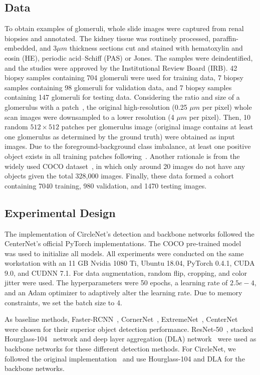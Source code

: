 \documentclass[journal]{IEEEtran}
\begin{document}
\subsection{Data}
To obtain examples of glomeruli, whole slide images were captured from renal biopsies and annotated. The kidney tissue was routinely processed, paraffin-embedded, and $3\mu m$ thickness sections cut and stained with hematoxylin and eosin (HE), periodic acid–Schiff (PAS) or Jones. The samples were deindentified, and the studies were approved by the Institutional Review Board (IRB). 42 biopsy samples containing 704 glomeruli were used for training data, 7 biopsy samples containing 98 glomeruli for validation data, and 7 biopsy samples containing 147 glomeruli for testing data. Considering the ratio and size of a glomerulus with a patch~\cite{puelles2011glomerular}, the original high-resolution (0.25 $\mu m$ per pixel) whole scan images were downsampled to a lower resolution (4 $\mu m$ per pixel). Then, 10 random $512 \times 512$ patches per glomerulus image (original image contains at least one glomerulus as determined by the ground truth) were obtained as input images. Due to the foreground-background class imbalance, at least one positive object exists in all training patches following~\cite{lin2017focal}. Another rationale is from the widely used COCO dataset~\cite{lin2014microsoft}, in which only around 20 images do not have any objects given the total 328,000 images. Finally, these data formed a cohort containing 7040 training, 980 validation, and 1470 testing images.

\subsection{Experimental Design}
The implementation of CircleNet's detection and backbone networks followed the CenterNet's official PyTorch implementations. The COCO pre-trained model~\cite{lin2014microsoft} was used to initialize all models. All experiments were conducted on the same workstation with an 11 GB Nvidia 1080 Ti, Ubuntu 18.04, PyTorch 0.4.1, CUDA 9.0, and CUDNN 7.1. For data augmentation, random flip, cropping, and color jitter were used. The hyperparameters were 50 epochs, a learning rate of $2.5e-4$, and an Adam optimizer to adaptively alter the learning rate. Due to memory constraints, we set the batch size to 4.

As baseline methods, Faster-RCNN~\cite{ren2015faster}, CornerNet~\cite{law2018cornernet}, ExtremeNet~\cite{zhou2019bottom}, CenterNet~\cite{zhou2019objects} were chosen for their superior object detection performance. ResNet-50~\cite{he2016deep}, stacked Hourglass-104~\cite{newell2016stacked} network and deep layer aggregation (DLA) network~\cite{yu2018deep} were used as backbone networks for these different detection methods. For CircleNet, we followed the original implementation~\cite{yang2020circlenet} and use Hourglass-104 and DLA for the backbone networks. 
\end{document}
